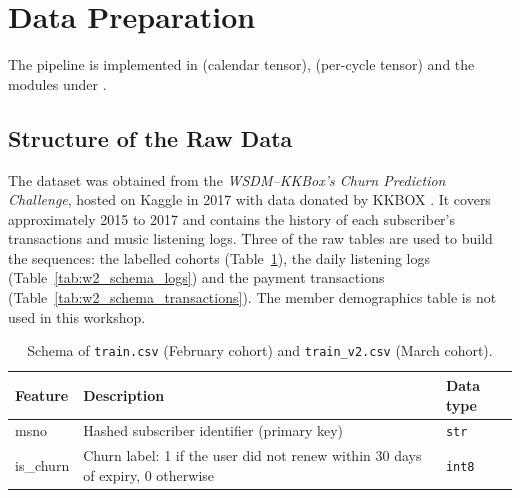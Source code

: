 \documentclass{article}
\begin{document}
\section{Data Preparation}

The pipeline is implemented in  (calendar tensor),  (per-cycle tensor) and the modules under .

\subsection{Structure of the Raw Data}

The dataset was obtained from the \emph{WSDM--KKBox's Churn Prediction Challenge}, hosted on Kaggle in 2017 with data donated by KKBOX \cite{kkbox2017}. It covers approximately 2015 to 2017 and contains the history of each subscriber's transactions and music listening logs. Three of the raw tables are used to build the sequences: the labelled cohorts (Table~\ref{tab:w2_schema_train}), the daily listening logs (Table~\ref{tab:w2_schema_logs}) and the payment transactions (Table~\ref{tab:w2_schema_transactions}). The member demographics table is not used in this workshop.

\begin{table}[H]
\centering
\renewcommand{\arraystretch}{1.3}
\begin{tabularx}{\textwidth}{|l|X|l|}
\hline
\textbf{Feature} & \textbf{Description} & \textbf{Data type} \\ \hline
msno      & Hashed subscriber identifier (primary key) & \texttt{str} \\ \hline
is\_churn & Churn label: 1 if the user did not renew within 30 days of expiry, 0 otherwise & \texttt{int8} \\ \hline
\end{tabularx}
\caption{Schema of \texttt{train.csv} (February cohort) and \texttt{train\_v2.csv} (March cohort).}
\label{tab:w2_schema_train}
\end{table}
\end{document}
